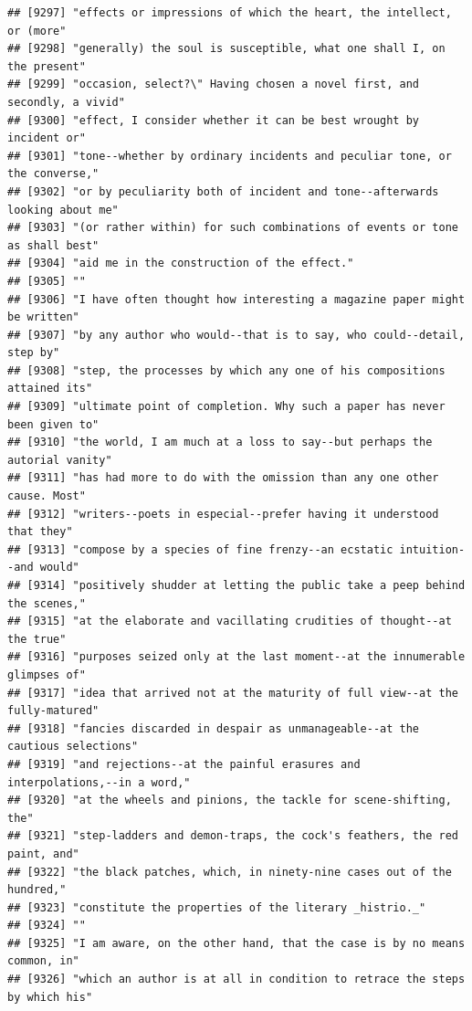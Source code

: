 \documentclass{article}\usepackage[]{graphicx}\usepackage[]{color}
\makeatletter
\newenvironment{kframe}{%
 \def\at@end@of@kframe{}%
 \ifinner\ifhmode%
  \def\at@end@of@kframe{\end{minipage}}%
  \begin{minipage}{\columnwidth}%
 \fi\fi%
 \def\FrameCommand##1{\hskip\@totalleftmargin \hskip-\fboxsep
 \colorbox{shadecolor}{##1}\hskip-\fboxsep
     \hskip-\linewidth \hskip-\@totalleftmargin \hskip\columnwidth}%
 \MakeFramed {\advance\hsize-\width
   \@totalleftmargin\z@ \linewidth\hsize
   \@setminipage}}%
 {\par\unskip\endMakeFramed%
 \at@end@of@kframe}
\newenvironment{knitrout}{}{} %
\makeatother
\begin{document}
\begin{knitrout}
\begin{kframe}
\begin{verbatim}
## [9297] "effects or impressions of which the heart, the intellect, or (more"          
## [9298] "generally) the soul is susceptible, what one shall I, on the present"        
## [9299] "occasion, select?\" Having chosen a novel first, and secondly, a vivid"      
## [9300] "effect, I consider whether it can be best wrought by incident or"            
## [9301] "tone--whether by ordinary incidents and peculiar tone, or the converse,"     
## [9302] "or by peculiarity both of incident and tone--afterwards looking about me"    
## [9303] "(or rather within) for such combinations of events or tone as shall best"    
## [9304] "aid me in the construction of the effect."                                   
## [9305] ""                                                                            
## [9306] "I have often thought how interesting a magazine paper might be written"      
## [9307] "by any author who would--that is to say, who could--detail, step by"         
## [9308] "step, the processes by which any one of his compositions attained its"       
## [9309] "ultimate point of completion. Why such a paper has never been given to"      
## [9310] "the world, I am much at a loss to say--but perhaps the autorial vanity"      
## [9311] "has had more to do with the omission than any one other cause. Most"         
## [9312] "writers--poets in especial--prefer having it understood that they"           
## [9313] "compose by a species of fine frenzy--an ecstatic intuition--and would"       
## [9314] "positively shudder at letting the public take a peep behind the scenes,"     
## [9315] "at the elaborate and vacillating crudities of thought--at the true"          
## [9316] "purposes seized only at the last moment--at the innumerable glimpses of"     
## [9317] "idea that arrived not at the maturity of full view--at the fully-matured"    
## [9318] "fancies discarded in despair as unmanageable--at the cautious selections"    
## [9319] "and rejections--at the painful erasures and interpolations,--in a word,"     
## [9320] "at the wheels and pinions, the tackle for scene-shifting, the"               
## [9321] "step-ladders and demon-traps, the cock's feathers, the red paint, and"       
## [9322] "the black patches, which, in ninety-nine cases out of the hundred,"          
## [9323] "constitute the properties of the literary _histrio._"                        
## [9324] ""                                                                            
## [9325] "I am aware, on the other hand, that the case is by no means common, in"      
## [9326] "which an author is at all in condition to retrace the steps by which his"    

\end{verbatim}
\end{kframe}
\end{knitrout}
\end{document}
